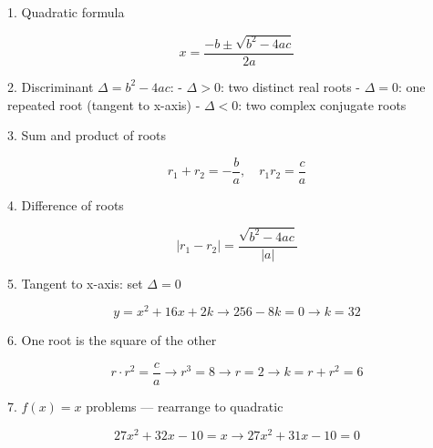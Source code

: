 1. Quadratic formula

$$ x = \frac{-b \pm \sqrt{b^2-4ac}}{2a} $$

2. Discriminant $\Delta = b^2 - 4ac$:
- $\Delta > 0$: two distinct real roots
- $\Delta = 0$: one repeated root (tangent to x-axis)
- $\Delta < 0$: two complex conjugate roots

3. Sum and product of roots

$$ r_1 + r_2 = -\frac{b}{a}, \quad r_1 r_2 = \frac{c}{a} $$

4. Difference of roots

$$ |r_1 - r_2| = \frac{\sqrt{b^2-4ac}}{|a|} $$

5. Tangent to x-axis: set $\Delta = 0$

$$ y = x^2+16x+2k \rightarrow 256-8k=0 \rightarrow k=32 $$

6. One root is the square of the other

$$ r \cdot r^2 = \frac{c}{a} \rightarrow r^3 = 8 \rightarrow r = 2 \rightarrow k = r+r^2 = 6 $$

7. $f(x) = x$ problems — rearrange to quadratic

$$ 27x^2+32x-10 = x \rightarrow 27x^2+31x-10=0 $$
